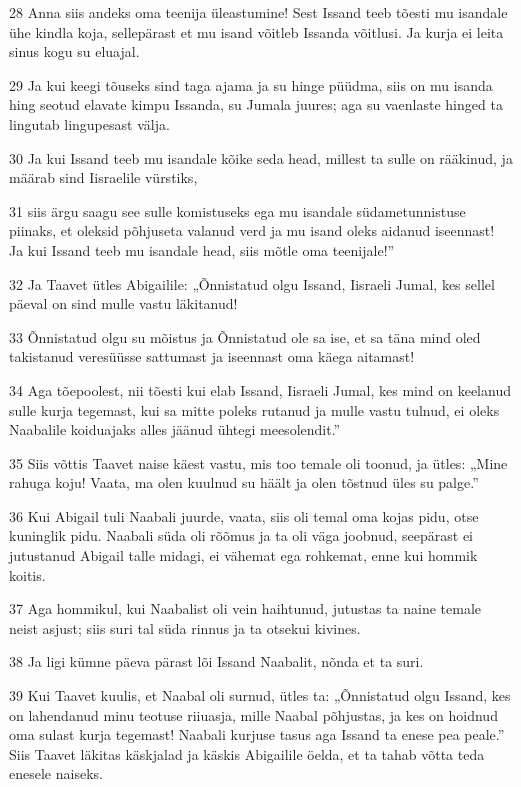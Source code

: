\par 28 Anna siis andeks oma teenija üleastumine! Sest Issand teeb tõesti mu isandale ühe kindla koja, sellepärast et mu isand võitleb Issanda võitlusi. Ja kurja ei leita sinus kogu su eluajal.
\par 29 Ja kui keegi tõuseks sind taga ajama ja su hinge püüdma, siis on mu isanda hing seotud elavate kimpu Issanda, su Jumala juures; aga su vaenlaste hinged ta lingutab lingupesast välja.
\par 30 Ja kui Issand teeb mu isandale kõike seda head, millest ta sulle on rääkinud, ja määrab sind Iisraelile vürstiks,
\par 31 siis ärgu saagu see sulle komistuseks ega mu isandale südametunnistuse piinaks, et oleksid põhjuseta valanud verd ja mu isand oleks aidanud iseennast! Ja kui Issand teeb mu isandale head, siis mõtle oma teenijale!”
\par 32 Ja Taavet ütles Abigailile: „Õnnistatud olgu Issand, Iisraeli Jumal, kes sellel päeval on sind mulle vastu läkitanud!
\par 33 Õnnistatud olgu su mõistus ja Õnnistatud ole sa ise, et sa täna mind oled takistanud veresüüsse sattumast ja iseennast oma käega aitamast!
\par 34 Aga tõepoolest, nii tõesti kui elab Issand, Iisraeli Jumal, kes mind on keelanud sulle kurja tegemast, kui sa mitte poleks rutanud ja mulle vastu tulnud, ei oleks Naabalile koiduajaks alles jäänud ühtegi meesolendit.”
\par 35 Siis võttis Taavet naise käest vastu, mis too temale oli toonud, ja ütles: „Mine rahuga koju! Vaata, ma olen kuulnud su häält ja olen tõstnud üles su palge.”
\par 36 Kui Abigail tuli Naabali juurde, vaata, siis oli temal oma kojas pidu, otse kuninglik pidu. Naabali süda oli rõõmus ja ta oli väga joobnud, seepärast ei jutustanud Abigail talle midagi, ei vähemat ega rohkemat, enne kui hommik koitis.
\par 37 Aga hommikul, kui Naabalist oli vein haihtunud, jutustas ta naine temale neist asjust; siis suri tal süda rinnus ja ta otsekui kivines.
\par 38 Ja ligi kümne päeva pärast lõi Issand Naabalit, nõnda et ta suri.
\par 39 Kui Taavet kuulis, et Naabal oli surnud, ütles ta: „Õnnistatud olgu Issand, kes on lahendanud minu teotuse riiuasja, mille Naabal põhjustas, ja kes on hoidnud oma sulast kurja tegemast! Naabali kurjuse tasus aga Issand ta enese pea peale.” Siis Taavet läkitas käskjalad ja käskis Abigailile öelda, et ta tahab võtta teda enesele naiseks.
